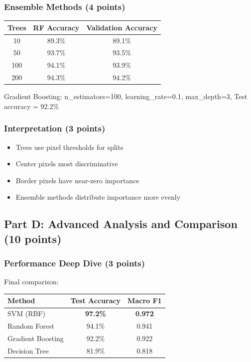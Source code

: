 \documentclass[12pt,a4paper]{article}
\theoremstyle{definition}
\begin{document}
\subsubsection{Ensemble Methods (4 points)}

\begin{center}
\begin{tabular}{|c|c|c|}
\hline
\textbf{Trees} & \textbf{RF Accuracy} & \textbf{Validation Accuracy} \\
\hline
10 & 89.3\% & 89.1\% \\
50 & 93.7\% & 93.5\% \\
100 & 94.1\% & 93.9\% \\
200 & 94.3\% & 94.2\% \\
\hline
\end{tabular}
\end{center}

Gradient Boosting: n\_estimators=100, learning\_rate=0.1, max\_depth=3, Test accuracy = 92.2\%

\subsubsection{Interpretation (3 points)}

\begin{itemize}
\item Trees use pixel thresholds for splits
\item Center pixels most discriminative
\item Border pixels have near-zero importance
\item Ensemble methods distribute importance more evenly
\end{itemize}

\subsection{Part D: Advanced Analysis and Comparison (10 points)}

\subsubsection{Performance Deep Dive (3 points)}

Final comparison:
\begin{center}
\begin{tabular}{|l|c|c|}
\hline
\textbf{Method} & \textbf{Test Accuracy} & \textbf{Macro F1} \\
\hline
SVM (RBF) & \textbf{97.2\%} & \textbf{0.972} \\
Random Forest & 94.1\% & 0.941 \\
Gradient Boosting & 92.2\% & 0.922 \\
Decision Tree & 81.9\% & 0.818 \\
\hline
\end{tabular}
\end{center}
\end{document}
